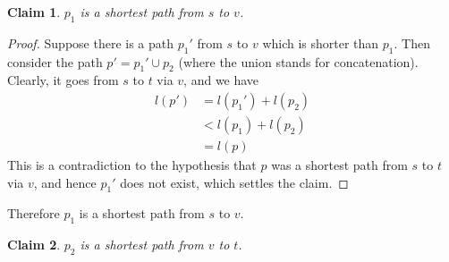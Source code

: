 \documentclass[answers]{exam}
\newtheorem{claim}{Claim}
\begin{document}
\begin{questions}
\begin{solution}

\begin{claim}
$p_1$ is a shortest path from $s$ to $v$.
\end{claim}

\begin{proof}
Suppose there is a path $p_1'$ from $s$ to $v$ which is shorter than $p_1$. Then consider the path $p' = p_1' \cup p_2$ (where the union stands for concatenation). Clearly, it goes from $s$ to $t$ via $v$, and we have 
\begin{align*}
    l(p') &= l(p_1') + l(p_2)\\
          &< l(p_1) + l(p_2)\\
          &= l(p)
\end{align*}
This is a contradiction to the hypothesis that $p$ was a shortest path from $s$ to $t$ via $v$, and hence $p_1'$ does not exist, which settles the claim.
\end{proof}

Therefore $p_1$ is a shortest path from $s$ to $v$.

\begin{claim}
$p_2$ is a shortest path from $v$ to $t$.
\end{claim}


\end{solution}
\end{questions}
\end{document}
